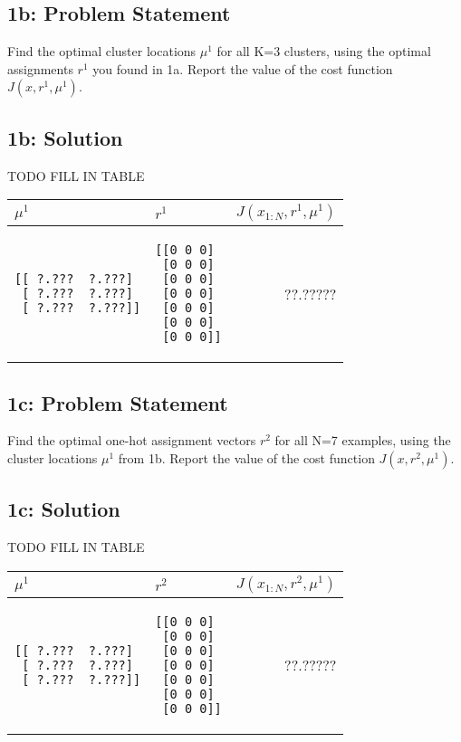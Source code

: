 \documentclass[10pt]{article}
\newcommand{\officialdirections}[1]{{\color{purple} #1}}
\begin{document}
\officialdirections{
\subsection*{1b: Problem Statement}
 Find the optimal cluster locations $\mu^1$ for all K=3 clusters, using the optimal assignments $r^1$ you found in 1a. Report the value of the cost function $J(x, r^1, \mu^1)$.}

\subsection{1b: Solution}
TODO FILL IN TABLE

\begin{tabular}{p{5cm} | p{5cm} | r}
$\mu^1$ & $r^1$ & $J(x_{1:N}, r^1, \mu^1)$
\\
\midrule
\begin{verbatim}
[[ ?.???  ?.???]
 [ ?.???  ?.???]
 [ ?.???  ?.???]]
\end{verbatim}
&	
\begin{verbatim}
[[0 0 0]
 [0 0 0]
 [0 0 0]
 [0 0 0]
 [0 0 0]
 [0 0 0]
 [0 0 0]]
\end{verbatim}
&
 ??.?????
\end{tabular}

\officialdirections{
\subsection*{1c: Problem Statement}
Find the optimal one-hot assignment vectors $r^2$ for all N=7 examples, using the cluster locations $\mu^1$ from 1b. Report the value of the cost function $J(x, r^2, \mu^1)$.
}

\subsection{1c: Solution}
TODO FILL IN TABLE

\begin{tabular}{p{5cm} | p{5cm} | r}
$\mu^1$ & $r^2$ & $J(x_{1:N}, r^2, \mu^1)$
\\
\midrule
\begin{verbatim}
[[ ?.???  ?.???]
 [ ?.???  ?.???]
 [ ?.???  ?.???]]
\end{verbatim}
&	
\begin{verbatim}
[[0 0 0]
 [0 0 0]
 [0 0 0]
 [0 0 0]
 [0 0 0]
 [0 0 0]
 [0 0 0]]
\end{verbatim}
&
 ??.?????
\end{tabular}
\end{document}
